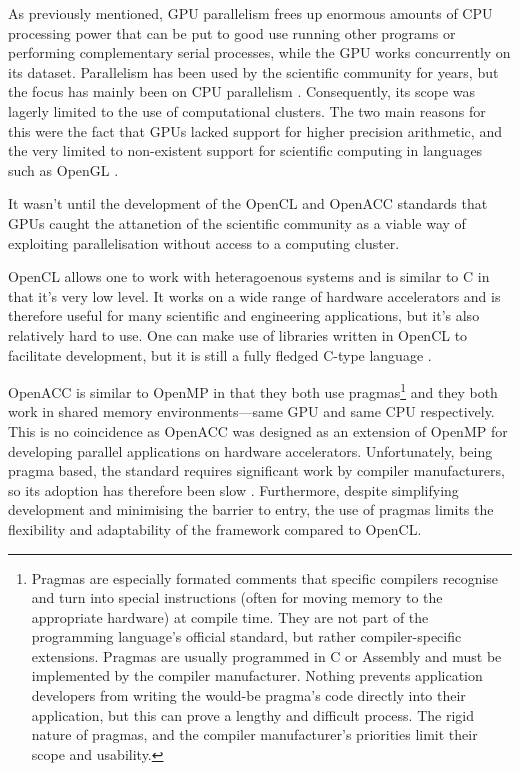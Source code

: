 As previously mentioned, GPU parallelism frees up enormous amounts of CPU processing power that can be put to good use running other programs or performing complementary serial processes, while the GPU works concurrently on its dataset. Parallelism has been used by the scientific community for years, but the focus has mainly been on CPU parallelism \cite{cpu_par}. Consequently, its scope was lagerly limited to the use of computational clusters. The two main reasons for this were the fact that GPUs lacked support for higher precision arithmetic, and the very limited to non-existent support for scientific computing in languages such as OpenGL \cite{gpu_comp}.

It wasn't until the development of the OpenCL and OpenACC standards that GPUs caught the attanetion of the scientific community as a viable way of exploiting parallelisation without access to a computing cluster.

OpenCL allows one to work with heteragoenous systems and is similar to C in that it's very low level. It works on a wide range of hardware accelerators and is therefore useful for many scientific and engineering applications, but it's also relatively hard to use. One can make use of libraries written in OpenCL to facilitate development, but it is still a fully fledged C-type language \cite{opencl}.

OpenACC is similar to OpenMP in that they both use pragmas\footnote{Pragmas are especially formated comments that specific compilers recognise and turn into special instructions (often for moving memory to the appropriate hardware) at compile time. They are not part of the programming language's official standard, but rather compiler-specific extensions. Pragmas are usually programmed in C or Assembly and must be implemented by the compiler manufacturer. Nothing prevents application developers from writing the would-be pragma's code directly into their application, but this can prove a lengthy and difficult process. The rigid nature of pragmas, and the compiler manufacturer's priorities limit their scope and usability.} and they both work in shared memory environments---same GPU and same CPU respectively. This is no coincidence as OpenACC was designed as an extension of OpenMP for developing parallel applications on hardware accelerators. Unfortunately, being pragma based, the standard requires significant work by compiler manufacturers, so its adoption has therefore been slow \cite{openacc}. Furthermore, despite simplifying development and minimising the barrier to entry, the use of pragmas limits the flexibility and adaptability of the framework compared to OpenCL.

